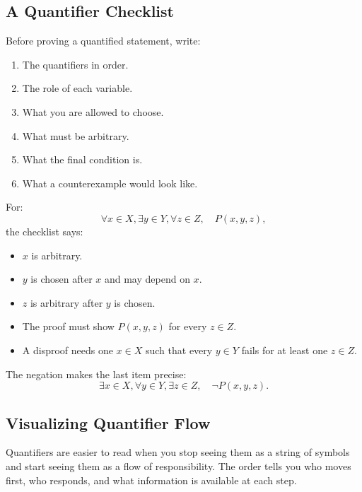 \subsection{A Quantifier Checklist}

Before proving a quantified statement, write:

\begin{enumerate}
\item The quantifiers in order.
\item The role of each variable.
\item What you are allowed to choose.
\item What must be arbitrary.
\item What the final condition is.
\item What a counterexample would look like.
\end{enumerate}

For:
\[
\forall x\in X,\exists y\in Y,\forall z\in Z,\quad P(x,y,z),
\]
the checklist says:

\begin{itemize}
\item $x$ is arbitrary.
\item $y$ is chosen after $x$ and may depend on $x$.
\item $z$ is arbitrary after $y$ is chosen.
\item The proof must show $P(x,y,z)$ for every $z\in Z$.
\item A disproof needs one $x\in X$ such that every $y\in Y$ fails for at least one $z\in Z$.
\end{itemize}

The negation makes the last item precise:
\[
\exists x\in X,\forall y\in Y,\exists z\in Z,\quad \neg P(x,y,z).
\]

\subsection{Visualizing Quantifier Flow}

Quantifiers are easier to read when you stop seeing them as a string of symbols and start seeing them as a flow of responsibility. The order tells you who moves first, who responds, and what information is available at each step.

